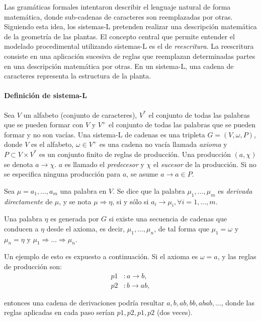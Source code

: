 Las gramáticas formales \cite{Chomsky1956} intentaron describir el lenguaje natural de forma matemática, donde sub-cadenas de caracteres son reemplazadas por otras.
Siguiendo esta idea, los sistemas-L \cite{Lindenmayer1968} pretenden realizar una descripción matemática de la geometría de las plantas.
El concepto central que permite entender el modelado procedimental utilizando sistemas-L es el de {\em reescritura}.
La reescritura consiste en una aplicación sucesiva de reglas que reemplazan determinadas partes en una descripción matemática por otras.
En un sistema-L, una cadena de caracteres representa la estructura de la planta.

\paragraph{Definición de sistema-L}
Sea $V$ un alfabeto (conjunto de caracteres), $V^{*}$ el conjunto de todas las palabras que se pueden formar con $V$ y $V^{+}$ el conjunto de todas las palabras que se pueden formar y no son vacías.
Una sistema-L de cadenas es una tripleta $G = (V,\omega,P)$, donde $V$ es el alfabeto, $\omega \in V^{+}$ es una cadena no vacía llamada {\em axioma} y $P \subset V \times V^{*}$ es un conjunto finito de reglas de producción.
Una producción $(a,\chi)$ se denota $a \rightarrow \chi$.
$a$ es llamado el {\em predecesor} y $\chi$ el {\em sucesor} de la producción.
Si no se especifica ninguna producción para $a$, se asume $a \rightarrow a \in P$.

Sea $\mu = a_{1}, \dots, a_{m}$ una palabra en $V$.
Se dice que la palabra $\mu_{1}, \dots, \mu_{m}$ es {\em derivada directamente} de $\mu$, y se nota $\mu \Rightarrow \eta$,  si y sólo si $a_{i} \rightarrow \mu_{i}, \forall i = 1, \dots, m$.

Una palabra $\eta$ es generada por $G$ si existe una secuencia de cadenas que conducen a $\eta$ desde el axioma, es decir, $\mu_{1},\dots,\mu_{n}$, de tal forma que $\mu_{1} = \omega$ y $\mu_{n} = \eta$ y $\mu_{1} \Rightarrow \dots  \Rightarrow \mu_{n}$.

Un ejemplo de esto es expuesto a continuación.
Si el axioma es $\omega = a$, y las reglas de producción son:
\begin{align*}
p1 &: a \rightarrow b,\\
p2 &: b \rightarrow ab,
\end{align*}

entonces una cadena de derivaciones podría resultar $a, b, ab, bb, abab, \dots$, donde las reglas aplicadas en cada paso serían $p1, p2, p1, p2$ (dos veces).

